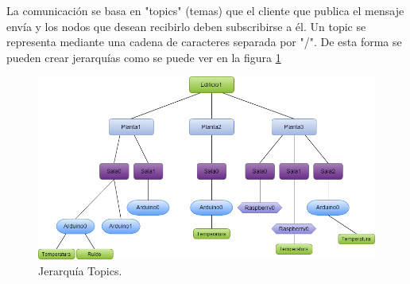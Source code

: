 \documentclass[12pt, twoside]{book}
\begin{document}
\newpage
La comunicación se basa en "topics" (temas) que el cliente que publica el mensaje envía y los nodos que desean recibirlo deben subscribirse a él. Un topic se representa mediante una cadena de caracteres separada por "/". De esta forma se pueden crear jerarquías como se puede ver en la figura \ref{L402} \
\begin{figure}[h!]
\centering
\includegraphics[scale=0.3]{images/jerarquia.png}
\caption{Jerarquía Topics.}\label{L402}
\end{figure}
\end{document}

